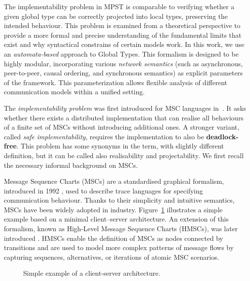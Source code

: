 The implementability problem in MPST is comparable to verifying 
whether a given global type can be correctly projected into local 
types, preserving the intended behaviour.
This problem is examined from a theoretical
perspective to provide a more formal and precise understanding of
the fundamental limits that exist and why syntactical constrains
of certain models work.
In this work, we use an \textit{automata-based} approach to Global Types. 
This formalism is designed to be highly modular, 
incorporating various \textit{network semantics} (such as asynchronous, 
peer-to-peer, causal ordering, and synchronous semantics) as explicit 
parameters of the framework. This parameterization allows flexible 
analysis of different communication models within a unified setting.

The \emph{implementability problem} was first introduced for MSC languages 
in~\cite{alur2000inference,alur2003inference}. It asks whether there 
exists a distributed implementation that can realise all behaviours of a 
finite set of MSCs without introducing additional ones. A stronger variant, 
called \emph{safe implementability}, requires the implementation to also be 
\textbf{deadlock-free}. This problem has some synonyms in the term, with 
slightly different definition, but it can be called also realisability and 
projectability. We first recall the necessary informal background on MSCs.

Message Sequence Charts (MSCs) are a standardised graphical formalism,
introduced in 1992 \cite{MSCStandard}, used to describe trace languages 
for specifying communication behaviour. Thanks to their simplicity and 
intuitive semantics, MSCs have been widely adopted in industry.
Figure~\ref{fig:msc-cli-ser} illustrates a simple example based on a
minimal client–server architecture. An extension of this formalism,
known as High-Level Message Sequence Charts (HMSCs), was later
introduced \cite{HMSCStandard}. HMSCs enable the definition of
MSCs as nodes connected by transitions and are used to model more
complex patterns of message flows by capturing sequences, alternatives,
or iterations of atomic MSC scenarios.

\begin{figure}[!ht]
\centering
\begin{msc}[draw frame=none, draw head=none, msc keyword=, head height=0px, label distance=0.5ex, foot height=0px, foot distance=0px]{}

	\nextlevel
\end{msc}
\caption{Simple example of a client-server architecture.}
\label{fig:msc-cli-ser}
\end{figure}

